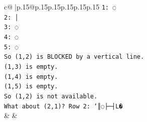 \documentclass{article}
\begin{document}
{\begin{supertabular}{c@{$\;$}|p{.15\linewidth}@{}p{.15\linewidth}p{.15\linewidth}p{.15\linewidth}p{.15\linewidth}p{.15\linewidth}}
{{{\texttt{1: ◌} \\
\texttt{2: │} \\
\texttt{3: ◌} \\
\texttt{4: ◌} \\
\texttt{5: ◌} \\
\texttt{So (1,2) is BLOCKED by a vertical line.} \\
\texttt{(1,3) is empty.} \\
\texttt{(1,4) is empty.} \\
\texttt{(1,5) is empty.} \\
\texttt{So (1,2) is not available.} \\
\texttt{What about (2,1)? Row 2: `║◌├─┤L�} \\
            }
        }
    }
    & & \\ \\


\end{supertabular}}
\end{document}
